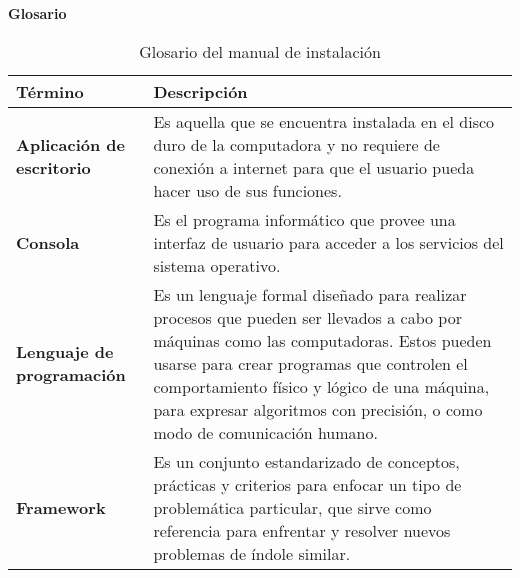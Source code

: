 \textbf{Glosario}

\begin{longtable}{ | p{2.5cm} | p{4.5cm} |  }
	\caption{Glosario del manual de instalación}
	\label{table:glosariomanuinsta}
	\\	\hline
		 \textbf{Término} &\textbf{Descripción}
        \\ \hline
        \textbf{Aplicación de escritorio}&Es aquella que se encuentra instalada en 
        el disco duro de la computadora y no requiere de conexión a internet para 
        que el usuario pueda hacer uso de sus funciones.
        \\ \hline
        \textbf{Consola} &Es el programa informático que provee una interfaz de 
        usuario para acceder a los servicios del sistema operativo.
        \\ \hline
        \textbf{Lenguaje de programación}&Es un lenguaje formal diseñado para 
        realizar procesos que pueden ser llevados a cabo por máquinas como las 
        computadoras. Estos pueden usarse para crear programas que controlen el 
        comportamiento físico y lógico de una máquina, para expresar algoritmos 
        con precisión, o como modo de comunicación humano.
        \\ \hline
        \textbf{Framework}&Es un conjunto estandarizado de conceptos, prácticas y 
        criterios para enfocar un tipo de problemática particular, que sirve como 
        referencia para enfrentar y resolver nuevos problemas de índole similar.
        \\ \hline
\end{longtable}
